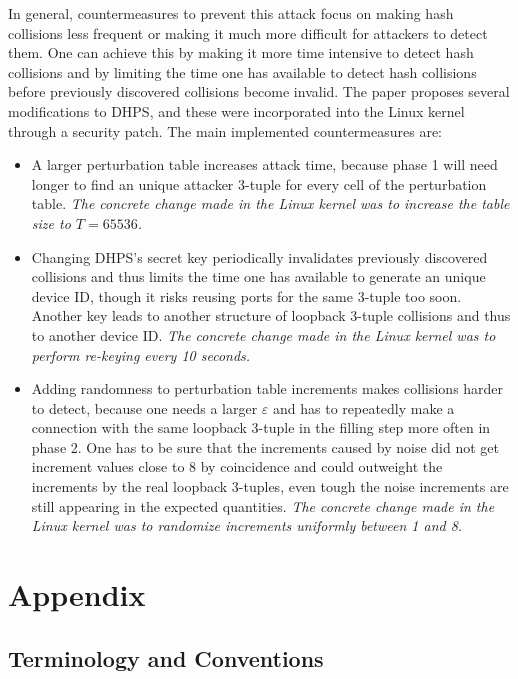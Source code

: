 \documentclass[twocolumn]{report}
\begin{document}
In \alert{general}, \alert{countermeasures} to prevent this attack focus on making hash collisions less frequent or making it much more difficult for attackers to detect them. One can achieve this by making it more time intensive to detect hash collisions and by limiting the time one has available to detect hash collisions before previously discovered collisions become invalid. The paper proposes several modifications to DHPS, and these were incorporated into the Linux kernel through a security patch. The main implemented countermeasures are:
\begin{itemize}
	\item {}
	A larger perturbation table increases attack time, because phase 1 will need longer to find an unique attacker 3-tuple for every cell of the perturbation table.
	\textit{The concrete change made in the Linux kernel was to increase the table size to $T = 65536$.}

	\item {}
	Changing DHPS’s secret key periodically invalidates previously discovered collisions and thus limits the time one has available to generate an unique device ID, though it risks reusing ports for the same 3-tuple too soon. Another key leads to another structure of loopback 3-tuple collisions and thus to another device ID.
	\textit{The concrete change made in the Linux kernel was to perform re-keying every 10 seconds.}

	\item {}
	Adding randomness to perturbation table increments makes collisions harder to detect, because one needs a larger $\varepsilon$ and has to repeatedly make a connection with the same loopback 3-tuple in the filling step more often in phase 2. One has to be sure that the increments caused by noise did not get increment values close to 8 by coincidence and could outweight the increments by the real loopback 3-tuples, even tough the noise increments are still appearing in the expected quantities.
	\textit{The concrete change made in the Linux kernel was to randomize increments uniformly between 1 and 8.}
\end{itemize}

\section{Appendix}
\label{sec:appendix}

\subsection{Terminology and Conventions}
\label{sec:terminology and conventions}
\end{document}
